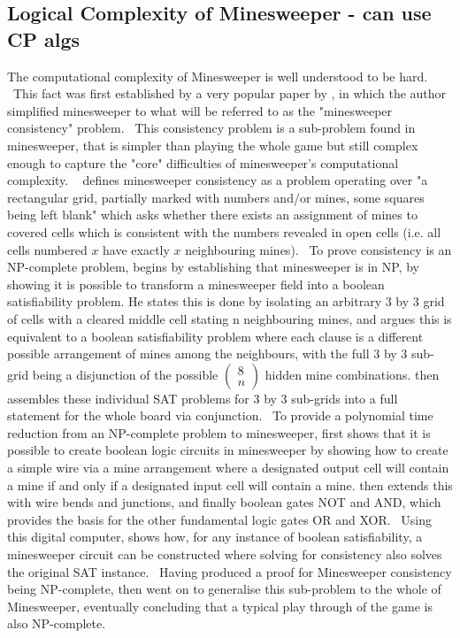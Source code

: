 \subsection{Logical Complexity of Minesweeper - can use CP algs} \label{awa:minesweeperNPcomplete}
The computational complexity of Minesweeper is well understood to be hard.
\
This fact was first established by a very popular paper by \citet{kaye2000minesweeper},
in which the author simplified minesweeper to what will be referred to as the "minesweeper consistency" problem.
\
This consistency problem is a sub-problem found in minesweeper, that is simpler than playing the whole game but still complex enough to capture the "core" difficulties of minesweeper's computational complexity.
\
\citet{kaye2000minesweeper} defines minesweeper consistency as a problem operating over "a rectangular grid, partially marked with numbers and/or mines, some squares being left blank" which asks whether there exists an assignment of mines to covered cells which is consistent with the numbers revealed in open cells (i.e. all cells numbered $x$ have exactly $x$ neighbouring mines).
\
To prove consistency is an NP-complete problem, \citet{kaye2000minesweeper} begins by establishing that minesweeper is in NP, by showing it is possible to transform a minesweeper field into a boolean satisfiability problem. He states this is done by isolating an arbitrary 3 by 3 grid of cells with a cleared middle cell stating n neighbouring mines, and argues this is equivalent to a boolean satisfiability problem where each clause is a different possible arrangement of mines among the neighbours, with the full 3 by 3 sub-grid being a disjunction of the possible $\begin{pmatrix}8 \\ n\end{pmatrix}$ hidden mine combinations. \citet{kaye2000minesweeper} then assembles these individual SAT problems for 3 by 3 sub-grids into a full statement for the whole board via conjunction.
\
To provide a polynomial time reduction from an NP-complete problem to minesweeper, \citet{kaye2000minesweeper} first shows that it is possible to create boolean logic circuits in minesweeper by showing how to create a simple wire via a mine arrangement where a designated output cell will contain a mine if and only if a designated input cell will contain a mine. \citet{kaye2000minesweeper} then extends this with wire bends and junctions, and finally boolean gates NOT and AND, which provides the basis for the other fundamental logic gates OR and XOR.
\
Using this digital computer, \citet{kaye2000minesweeper} shows how, for any instance of boolean satisfiability, a minesweeper circuit can be constructed where solving for consistency also solves the original SAT instance.
\
Having produced a proof for Minesweeper consistency being NP-complete, \citet{kaye2000minesweeper} then went on to generalise this sub-problem to the whole of Minesweeper, eventually concluding that a typical play through of the game is also NP-complete.

